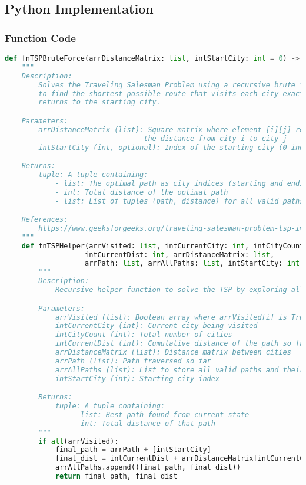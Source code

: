 \documentclass{article}
\begin{document}
\subsection*{Python Implementation}
\subsubsection*{Function Code}
\begin{lstlisting}[language=Python]
def fnTSPBruteForce(arrDistanceMatrix: list, intStartCity: int = 0) -> tuple[list, int, list]:
    """
    Description:
        Solves the Traveling Salesman Problem using a recursive brute force approach
        to find the shortest possible route that visits each city exactly once and
        returns to the starting city.

    Parameters:
        arrDistanceMatrix (list): Square matrix where element [i][j] represents 
                                 the distance from city i to city j
        intStartCity (int, optional): Index of the starting city (0-indexed). Defaults to 0.

    Returns:
        tuple: A tuple containing:
            - list: The optimal path as city indices (starting and ending with intStartCity)
            - int: Total distance of the optimal path
            - list: List of tuples (path, distance) for all valid paths

    References:
        https://www.geeksforgeeks.org/traveling-salesman-problem-tsp-implementation/
    """
    def fnTSPHelper(arrVisited: list, intCurrentCity: int, intCityCount: int, 
                   intCurrentDist: int, arrDistanceMatrix: list, 
                   arrPath: list, arrAllPaths: list, intStartCity: int) -> tuple[list, int]:
        """
        Description:
            Recursive helper function to solve the TSP by exploring all possible paths.

        Parameters:
            arrVisited (list): Boolean array where arrVisited[i] is True if city i is visited
            intCurrentCity (int): Current city being visited
            intCityCount (int): Total number of cities
            intCurrentDist (int): Cumulative distance of the path so far
            arrDistanceMatrix (list): Distance matrix between cities
            arrPath (list): Path traversed so far
            arrAllPaths (list): List to store all valid paths and their distances
            intStartCity (int): Starting city index

        Returns:
            tuple: A tuple containing:
                - list: Best path found from current state
                - int: Total distance of that path
        """
        if all(arrVisited):
            final_path = arrPath + [intStartCity]
            final_dist = intCurrentDist + arrDistanceMatrix[intCurrentCity][intStartCity]
            arrAllPaths.append((final_path, final_dist))
            return final_path, final_dist
        

\end{lstlisting}
\end{document}
